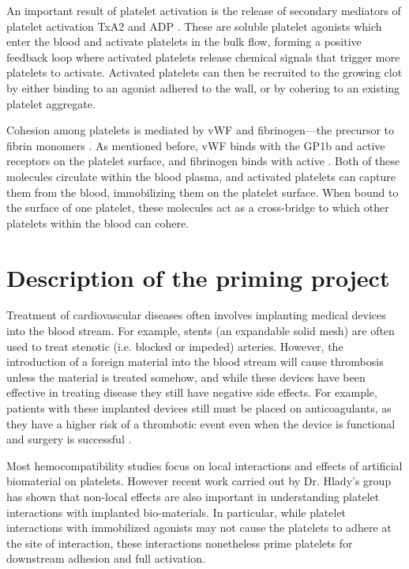 An important result of platelet activation is the release of secondary
mediators of platelet activation TxA2 and ADP \cite{Bye2016}. These
are soluble platelet agonists which enter the blood and activate
platelets in the bulk flow, forming a positive feedback loop where
activated platelets release chemical signals that trigger more
platelets to activate. Activated platelets can then be recruited to
the growing clot by either binding to an agonist adhered to the wall,
or by cohering to an existing platelet aggregate.

Cohesion among platelets is mediated by vWF and fibrinogen---the
precursor to fibrin monomers \cite{Fogelson2015}. As mentioned before,
vWF binds with the GP1b and active  receptors on the
platelet surface, and fibrinogen binds with active
. Both of these molecules circulate within the blood
plasma, and activated platelets can capture them from the blood,
immobilizing them on the platelet surface. When bound to the surface
of one platelet, these molecules act as a cross-bridge to which other
platelets within the blood can cohere.

\section{Description of the priming project}
\label{sec:priming-project}

Treatment of cardiovascular diseases often involves implanting medical
devices into the blood stream. For example, stents (an expandable
solid mesh) are often used to treat stenotic (i.e. blocked or impeded)
arteries. However, the introduction of a foreign material into the
blood stream will cause thrombosis unless the material is treated
somehow, and while these devices have been effective in treating
disease they still have negative side effects. For example, patients
with these implanted devices still must be placed on anticoagulants,
as they have a higher risk of a thrombotic event even when the device
is functional and surgery is successful \cite{Cannegieter1994}.

Most hemocompatibility studies focus on local interactions and effects
of artificial biomaterial on platelets. However recent work
\cite{Corum2011,Corum2012} carried out by Dr. Hlady's group has shown
that non-local effects are also important in understanding platelet
interactions with implanted bio-materials. In particular, while
platelet interactions with immobilized agonists may not cause the
platelets to adhere at the site of interaction, these interactions
nonetheless prime platelets for downstream adhesion and full
activation.

